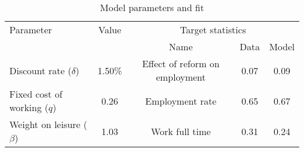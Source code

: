 \begin{table}[htbp]\caption{Model parameters and fit}\label{table:model_param}\centering\footnotesize\begin{tabular}{lcccc} \toprule  Parameter & Value & \multicolumn{3}{c}{Target statistics}  \\\cline{3-5}  &  &  Name & Data & Model  \\\midrule    Discount rate ($\delta$)      &1.50\%& Effect of reform on employment   & 0.07 &0.09\\ Fixed cost of working ($q$)   &0.26& Employment rate                  & 0.65 &0.67\\ Weight on leisure ($\beta$)   &1.03& Work full time             & 0.31 &0.24\\  \bottomrule\end{tabular}\end{table}